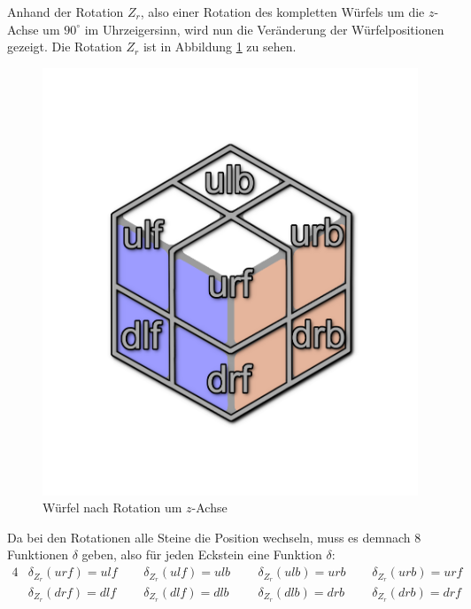 \documentclass[12pt,a4paper, usenames, dvipsnames]{article}
\theoremstyle{mystyle}
\theoremstyle{definition}
\begin{document}
Anhand der Rotation $Z_r$, also einer Rotation des kompletten Würfels um die $z$-Achse um $90^\circ$ im Uhrzeigersinn, wird nun die Veränderung der Würfelpositionen gezeigt. Die Rotation $Z_r$ ist in Abbildung \ref{Abbildung_WürfelNachRotationUmZAchse} zu sehen.
\begin{figure}[H]
\centering
\includegraphics[scale=0.13]{auf_ulf.png}
\caption{Würfel nach Rotation um $z$-Achse}
\label{Abbildung_WürfelNachRotationUmZAchse}
\end{figure}
Da bei den Rotationen alle Steine die Position wechseln, muss es demnach 8 Funktionen $\delta$ geben, also für jeden Eckstein eine Funktion $\delta$:
\begin{alignat*}{4}
& \delta_{Z_r}(\textit{urf}) = \textit{ulf} \ \ \ \ \ \ & \delta_{Z_r}(\textit{ulf}) = \textit{ulb} \ \ \ \ \ \ & \delta_{Z_r}(\textit{ulb}) = \textit{urb} \ \ \ \ \ \ & \delta_{Z_r}(\textit{urb}) = \textit{urf} \\
& \delta_{Z_r}(\textit{drf}) = \textit{dlf} \ \ \ \ \ \ & \delta_{Z_r}(\textit{dlf}) = \textit{dlb} \ \ \ \ \ \ \ & \delta_{Z_r}(\textit{dlb}) = \textit{drb} \ \ \ \ \ \ & \delta_{Z_r}(\textit{drb}) = \textit{drf}
\end{alignat*}
\end{document}
